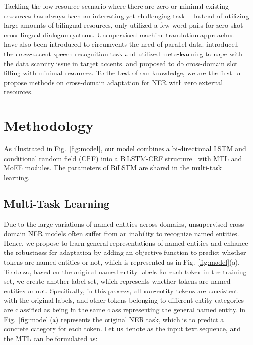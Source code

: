 \documentclass[11pt,a4paper]{article}
\begin{document}
Tackling the low-resource scenario where there are zero or minimal existing resources has always been an interesting yet challenging task~\cite{xie2018neural,liu2019attention,lample2017unsupervised,conneau2017word,shah2019robust}. Instead of utilizing large amounts of bilingual resources, \citet{liu2019zero,liu2019attention} only utilized a few word pairs for zero-shot cross-lingual dialogue systems. Unsupervised machine translation approaches~\cite{lample2017unsupervised,artetxe2017unsupervised} have also been introduced to circumvents the need of parallel data. \citet{winata2020learning} introduced the cross-accent speech recognition task and utilized meta-learning to cope with the data scarcity issue in target accents. 
\citet{bapna2017towards} and \citet{shah2019robust} proposed to do cross-domain slot filling with minimal resources.
To the best of our knowledge, we are the first to propose methods on cross-domain adaptation for NER with zero external resources.


\section{Methodology}
As illustrated in Fig.~\ref{fig:model}, our model combines a bi-directional LSTM and conditional random field (CRF) into a BiLSTM-CRF structure~\cite{lample2016neural} with MTL and MoEE modules. The parameters of BiLSTM are shared in the multi-task learning. 

\subsection{Multi-Task Learning}
Due to the large variations of named entities across domains, unsupervised cross-domain NER models often suffer from an inability to recognize named entities.
Hence, we propose to learn general representations of named entities and enhance the robustness for adaptation by adding an objective function to predict whether tokens are named entities or not, which is represented as  in Fig.~\ref{fig:model}(a). To do so, based on the original named entity labels for each token in the training set, we create another label set, which represents whether tokens are named entities or not. Specifically, in this process, all non-entity tokens are consistent with the original labels, and other tokens belonging to different entity categories are classified as being in the same class representing the general named entity.  in Fig.~\ref{fig:model}(a) represents the original NER task, which is to predict a concrete category for each token. Let us denote  as the input text sequence, and the MTL can be formulated as:
\end{document}
